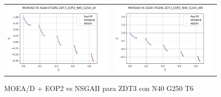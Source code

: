 \begin{figure}[H]
\begin{tabular}{c c}
    \includegraphics[scale=0.5]{figures/ZDT3_EOP2_N40_G250_T6/s9_comp.png} &
    \includegraphics[scale=0.5]{figures/ZDT3_EOP2_N40_G250_T6/s99_comp.png}\\
    \end{tabular}
    \caption{\centering MOEA/D + EOP2 vs NSGAII para ZDT3 con N40 G250 T6}
    \label{fig:5}
\end{figure}

